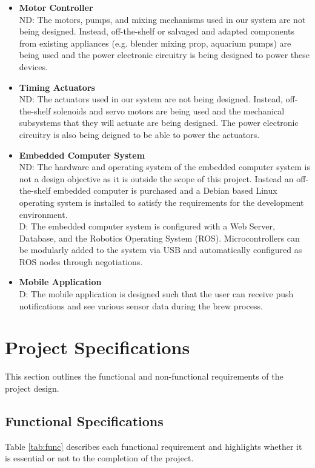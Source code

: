 \documentclass{article}
\begin{document}
\begin{itemize}
\item\textbf{Motor Controller}
\\ND: The motors, pumps, and mixing mechanisms used in our system are not being designed. Instead, off-the-shelf or salvaged and adapted components from existing appliances (e.g. blender mixing prop, aquarium pumps) are being used and the power electronic circuitry is being designed to power these devices.

\item\textbf{Timing Actuators}
\\ND: The actuators used in our system are not being designed. Instead, off-the-shelf solenoids and servo motors are being used and the mechanical subsystems that they will actuate are being designed. The power electronic circuitry is also being deigned to be able to power the actuators.

\item\textbf{Embedded Computer System}
\\ND: The hardware and operating system of the embedded computer system is not a design objective as it is outside the scope of this project. Instead an off-the-shelf embedded computer is purchased and a Debian based Linux operating system is installed to satisfy the requirements for the development environment.
\\D: The embedded computer system is configured with a Web Server, Database, and the Robotics Operating System (ROS).  Microcontrollers can be modularly added to the system via USB and automatically configured as ROS nodes through negotiations.

\item\textbf{Mobile Application}
\\D: The mobile application is designed such that the user can receive push notifications and see various sensor data during the brew process.
\end{itemize}

\section{Project Specifications}
This section outlines the functional and non-functional requirements of the project design.
\subsection{Functional Specifications}\label{FS}
Table \ref{tab:func} describes each functional requirement and highlights whether it is essential or not to the completion of the project.
\end{document}
